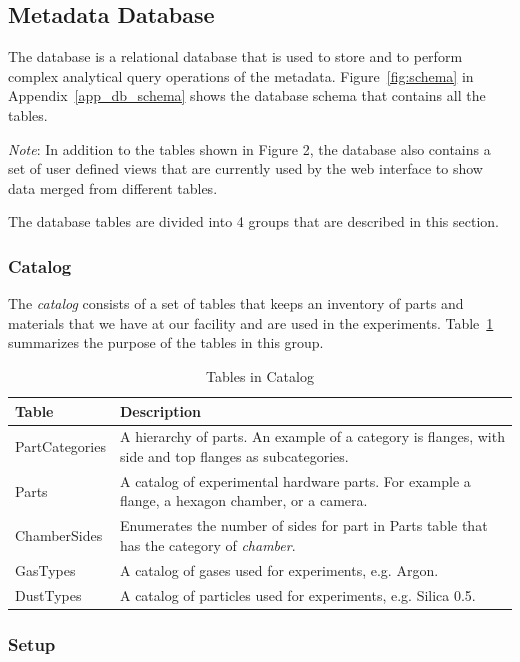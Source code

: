 \documentclass{sig-alternate}
\begin{document}
\subsection{Metadata Database}

The database is a relational database that is used to store and to perform complex analytical query operations of the metadata. Figure~\ref{fig:schema} in Appendix~\ref{app_db_schema} shows the database schema that contains all the tables.

\emph{Note}: In addition to the tables shown in Figure 2, the database also contains a set of user defined views that are currently used by the web interface to show data merged from different tables.

The database tables are divided into 4 groups that are described in this section. 


\subsubsection{Catalog}

The \emph{catalog} consists of a set of tables that keeps an inventory of parts and materials that we have at our facility and are used in the experiments. Table~\ref{tb_tables_in_catalog} summarizes the purpose of the tables in this group.

\begin{table}[h]
\centering
\caption{Tables in Catalog}\label{tb_tables_in_catalog}
\begin{tabular}{l p{5.6cm}} \hline
{\bf Table} 		& {\bf Description}\\ \hline
PartCategories 	& A hierarchy of parts. An example of a category is flanges, with side and top flanges as subcategories.\\ \hline
Parts			& A catalog of experimental hardware parts. For example a flange, a hexagon chamber, or a camera.\\ \hline
ChamberSides	& Enumerates the number of sides for part in Parts table that has the category of \emph{chamber}. \\ \hline
GasTypes		& A catalog of gases used for experiments, e.g. Argon. \\ \hline
DustTypes		& A catalog of particles used for experiments, e.g. Silica 0.5.\\ \hline
\end{tabular}
\end{table}


\subsubsection{Setup}
\end{document}
